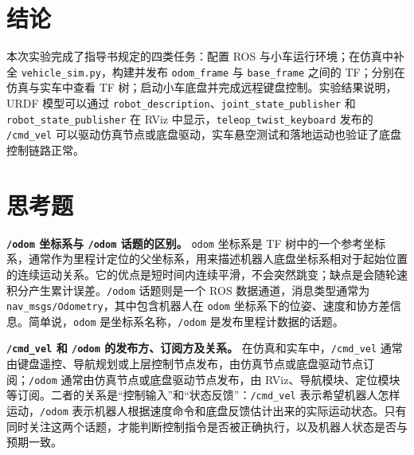 \documentclass[11pt,a4paper,fontset=fandol]{ctexart}
\begin{document}
\section{结论}

本次实验完成了指导书规定的四类任务：配置 ROS 与小车运行环境；在仿真中补全 \verb|vehicle_sim.py|，构建并发布 \verb|odom_frame| 与 \verb|base_frame| 之间的 TF；分别在仿真与实车中查看 TF 树；启动小车底盘并完成远程键盘控制。实验结果说明，URDF 模型可以通过 \verb|robot_description|、\verb|joint_state_publisher| 和 \verb|robot_state_publisher| 在 RViz 中显示，\verb|teleop_twist_keyboard| 发布的 \verb|/cmd_vel| 可以驱动仿真节点或底盘驱动，实车悬空测试和落地运动也验证了底盘控制链路正常。

\section{思考题}

\textbf{\texttt{/odom} 坐标系与 \texttt{/odom} 话题的区别。} \verb|odom| 坐标系是 TF 树中的一个参考坐标系，通常作为里程计定位的父坐标系，用来描述机器人底盘坐标系相对于起始位置的连续运动关系。它的优点是短时间内连续平滑，不会突然跳变；缺点是会随轮速积分产生累计误差。\verb|/odom| 话题则是一个 ROS 数据通道，消息类型通常为 \verb|nav_msgs/Odometry|，其中包含机器人在 \verb|odom| 坐标系下的位姿、速度和协方差信息。简单说，\verb|odom| 是坐标系名称，\verb|/odom| 是发布里程计数据的话题。

\textbf{\texttt{/cmd\_vel} 和 \texttt{/odom} 的发布方、订阅方及关系。} 在仿真和实车中，\verb|/cmd_vel| 通常由键盘遥控、导航规划或上层控制节点发布，由仿真节点或底盘驱动节点订阅；\verb|/odom| 通常由仿真节点或底盘驱动节点发布，由 RViz、导航模块、定位模块等订阅。二者的关系是“控制输入”和“状态反馈”：\verb|/cmd_vel| 表示希望机器人怎样运动，\verb|/odom| 表示机器人根据速度命令和底盘反馈估计出来的实际运动状态。只有同时关注这两个话题，才能判断控制指令是否被正确执行，以及机器人状态是否与预期一致。
\end{document}
